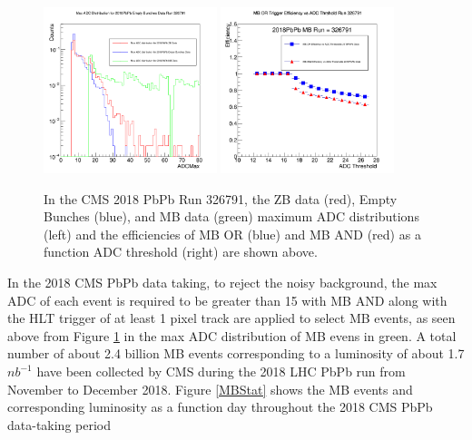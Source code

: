 \begin{figure}[hbtp]
\begin{center}
\includegraphics[width=0.45\textwidth]{Figures/Chapter3/MaxADC.png}
\includegraphics[width=0.45\textwidth]{Figures/Chapter3/MBTrgEffADC.png}
\caption{In the CMS 2018 PbPb Run 326791, the ZB data (red), Empty Bunches (blue), and MB data (green) maximum ADC distributions (left) and the efficiencies of MB OR (blue) and MB AND (red) as a function ADC threshold (right) are shown above.}
\label{2018PbPbMB}
\end{center}
\end{figure} 

In the 2018 CMS PbPb data taking, to reject the noisy background, the max ADC of each event is required to be greater than 15 with MB AND along with the HLT trigger of at least 1 pixel track are applied to select MB events, as seen above from Figure \ref{2018PbPbMB} in the max ADC distribution of MB evens in green. A total number of about 2.4 billion MB events corresponding to a luminosity of about 1.7 $nb^{-1}$ have been collected by CMS during the 2018 LHC PbPb run from November to December 2018. Figure \ref{MBStat} shows the MB events and corresponding luminosity as a function day throughout the 2018 CMS PbPb data-taking period

